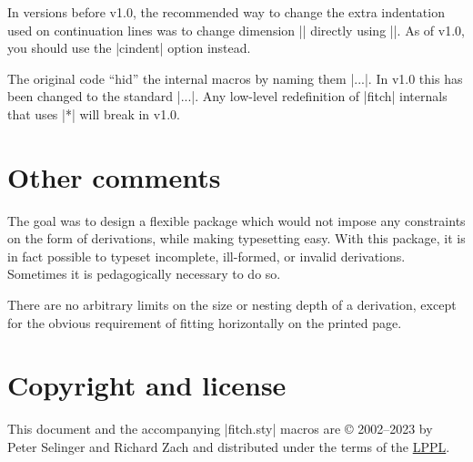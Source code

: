 \documentclass{ltxdoc}
\newcommand\NewIn[1]{\leavevmode
  \marginpar{\hfill\fbox{\fbox{New in #1}}\hspace*{1em}}\ignorespaces}
\begin{document}
\NewIn{1.0}\DescribeMacro{\ndindent} In versions before v1.0, the recommended way
to change the extra indentation used on continuation lines was to
change dimension |\ndindent| directly using |\setlength|. As of v1.0,
you should use the |cindent| option instead.

The original code ``hid'' the internal macros by naming
them |\nd*...|. In v1.0 this has been changed to the standard
|\nd@...|. Any low-level redefinition of |fitch| internals that uses
|*| will break in v1.0.

\section{Other comments}

The goal was to design a flexible package which would not impose any
constraints on the form of derivations, while making typesetting easy.
With this package, it is in fact possible to typeset incomplete,
ill-formed, or invalid derivations. Sometimes it is pedagogically necessary
to do so.

There are no arbitrary limits on the size or nesting depth of a derivation,
except for the obvious requirement of fitting horizontally on the
printed page.

\section{Copyright and license}

This document and the accompanying |fitch.sty| macros are {\copyright}
2002--2023 by Peter Selinger and Richard Zach and distributed under
the terms of the \href{https://www.latex-project.org/lppl/}{LPPL}.
\end{document}

